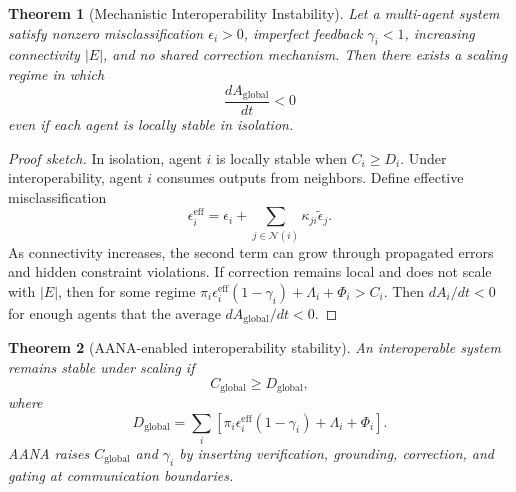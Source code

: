 \documentclass[11pt]{article}
\newtheorem{theorem}{Theorem}
\newcommand{\Aglobal}{A_{\mathrm{global}}}
\newcommand{\Dglobal}{D_{\mathrm{global}}}
\newcommand{\Cglobal}{C_{\mathrm{global}}}
\newcommand{\eps}{\epsilon}
\newcommand{\gam}{\gamma}
\begin{document}
\begin{theorem}[Mechanistic Interoperability Instability]
Let a multi-agent system satisfy nonzero misclassification $\eps_i>0$, imperfect feedback $\gam_i<1$, increasing connectivity $|E|$, and no shared correction mechanism. Then there exists a scaling regime in which
\begin{equation}
\frac{d\Aglobal}{dt}<0
\end{equation}
even if each agent is locally stable in isolation.
\end{theorem}
\begin{proof}[Proof sketch]
In isolation, agent $i$ is locally stable when $C_i\ge D_i$. Under interoperability, agent $i$ consumes outputs from neighbors. Define effective misclassification
\begin{equation}
\eps_i^{\mathrm{eff}}=\eps_i+\sum_{j\in\mathcal{N}(i)}\kappa_{ji}\tilde{\eps}_j.
\end{equation}
As connectivity increases, the second term can grow through propagated errors and hidden constraint violations. If correction remains local and does not scale with $|E|$, then for some regime $\pi_i\eps_i^{\mathrm{eff}}(1-\gam_i)+\Lambda_i+\Phi_i>C_i$. Then $dA_i/dt<0$ for enough agents that the average $d\Aglobal/dt<0$.
\end{proof}

\begin{theorem}[AANA-enabled interoperability stability]
An interoperable system remains stable under scaling if
\begin{equation}
\Cglobal\ge \Dglobal,
\end{equation}
where
\begin{equation}
\Dglobal=\sum_i\left[\pi_i\eps_i^{\mathrm{eff}}(1-\gam_i)+\Lambda_i+\Phi_i\right].
\end{equation}
AANA raises $\Cglobal$ and $\gam_i$ by inserting verification, grounding, correction, and gating at communication boundaries.
\end{theorem}
\end{document}
